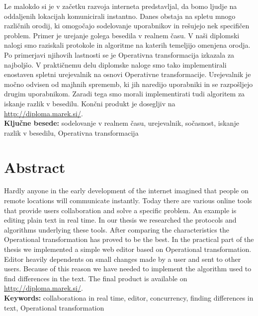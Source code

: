 \documentclass[a4paper, 12pt, twoside]{book}
\newcommand{\clearemptydoublepage}{\newpage{\pagestyle{empty}\cleardoublepage}} %
\begin{document}
Le malokdo si je v začetku razvoja interneta predstavljal, da bomo ljudje na oddaljenih lokacijah komunicirali instantno. Danes obstaja na spletu mnogo različnih orodij, ki omogočajo sodelovanje uporabnikov in rešujejo nek specifičen problem. Primer je urejanje golega besedila v realnem času. V naši diplomski nalogi smo raziskali protokole in algoritme na katerih temeljijo omenjena orodja. Po primerjavi njihovih lastnosti se je Operativna transformacija izkazala za najboljšo. V praktičnemu delu diplomske naloge smo tako implementirali enostaven spletni urejevalnik na osnovi Operativne transformacije. Urejevalnik je močno odvisen od majhnih sprememb, ki jih naredijo uporabniki in se razpošljejo drugim uporabnikom. Zaradi tega smo morali implementirati tudi algoritem za iskanje razlik v besedilu. Končni produkt je dosegljiv na \url{http://diploma.marek.si/}.\\

\textbf{Ključne besede:} sodelovanje v realnem času, urejevalnik, sočasnost, iskanje razlik v besedilu, Operativna transformacija


\clearemptydoublepage

\chapter*{Abstract}
Hardly anyone in the early development of the internet imagined that people on remote locations will communicate instantly. Today there are various online tools that provide users collaboration and solve a specific problem. An example is editing plain text in real time. In our thesis we researched the protocols and algorithms underlying these tools. After comparing the characteristics the Operational transformation has proved to be the best. In the practical part of the thesis we implemented a simple web editor based on Operational transformation. Editor heavily dependents on small changes made by a user and sent to other users. Because of this reason we have needed to implement the algorithm used to find differences in the text. The final product is available on \url{http://diploma.marek.si/}.\\

\textbf{Keywords:} collaborationa in real time, editor, concurrency, finding differences in text, Operational transformation


\clearemptydoublepage
\end{document}
